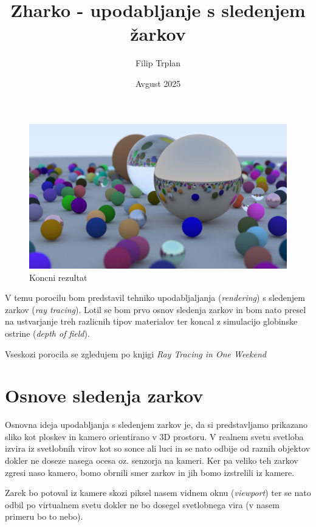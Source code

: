 \documentclass[12pt, a4paper]{article}
\title{Zharko - upodabljanje s sledenjem žarkov}
\author{Filip Trplan}
\date{Avgust 2025}
\begin{document}
\maketitle

\begin{figure}[h]
	\centering
	\includegraphics[width=\textwidth]{cover}
	\caption{Koncni rezultat}
\end{figure}

V temu porocilu bom predstavil tehniko upodabljaljanja (\textit{rendering}) s sledenjem zarkov
(\textit{ray tracing}). Lotil se bom prvo osnov sledenja zarkov in bom nato presel na ustvarjanje treh
razlicnih tipov materialov ter koncal z simulacijo globinske ostrine (\textit{depth of field}).

Vseskozi porocila se zgledujem po knjigi \textit{Ray Tracing in One Weekend} \cite{Shirley2025RTW1}

\section{Osnove sledenja zarkov}

Osnovna ideja upodabljanja s sledenjem zarkov je, da si predstavljamo prikazano sliko kot ploskev in kamero
orientirano v 3D prostoru. V realnem svetu svetloba izvira iz svetlobnih virov kot so sonce ali luci in se
nato odbije od raznih objektov dokler ne doseze nasega ocesa oz. senzorja na kameri. Ker pa veliko teh zarkov
zgresi naso kamero, bomo obrnili smer zarkov in jih bomo izstrelili iz kamere.

Zarek bo potoval iz kamere skozi piksel nasem vidnem oknu (\textit{viewport}) ter se nato odbil po
virtualnem svetu dokler ne bo dosegel svetlobnega vira (v nasem primeru bo to nebo).
\end{document}
